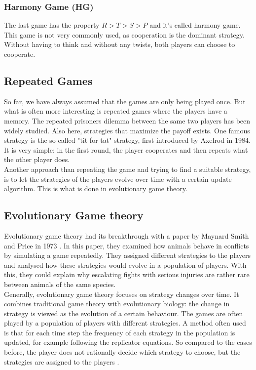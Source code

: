 \documentclass[12pt,oneside,a4paper,fleqn]{article}
\begin{document}
\subsubsection{Harmony Game (HG)}
The last game has the property $R > T > S > P$ and it's called harmony game. This game is not very commonly used, as cooperation is the dominant strategy. Without having to think and without any twists, both players can choose to cooperate.

\subsection{Repeated Games}
So far, we have always assumed that the games are only being played once. But what is often more interesting is repeated games where the players have a memory. The repeated prisoners dilemma between the same two players has been widely studied. Also here, strategies that maximize the payoff exists. One famous strategy is the so called "tit for tat" strategy, first introduced by Axelrod \cite{axelrod1984evolution} in 1984. It is very simple: in the first round, the player cooperates and then repeats what the other player does.\\
Another approach than repeating the game and trying to find a suitable strategy, is to let the strategies of the players evolve over time with a certain update algorithm. This is what is done in evolutionary game theory.

\subsection{Evolutionary Game theory}
Evolutionary game theory had its breakthrough with a paper by Maynard Smith and Price in 1973 \cite{smith1973logic}. In this paper, they examined how animals behave in conflicts by simulating a game repeatedly. They assigned different strategies to the players and analysed how these strategies would evolve in a population of players. With this, they could explain why escalating fights with serious injuries are rather rare between animals of the same species.
\\ Generally, evolutionary game theory focuses on strategy changes over time. It combines traditional game theory with evolutionary biology: the change in strategy is viewed as the evolution of a certain behaviour. The games are often played by a population of players with different strategies. A method often used is that for each time step the frequency of each strategy in the population is updated, for example following the replicator equations. So compared to the cases before, the player does not rationally decide which strategy to choose, but the strategies are assigned to the players \cite{epstein1998}.
\end{document}
